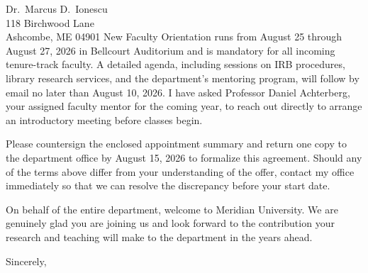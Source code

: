 \documentclass[
  fontsize=11pt,
  parskip=half,
  subject=titled,
  backaddress=true,
  fromalign=right,
  fromphone=true,
  fromemail=true,
  fromurl=true,
  addrfield=true,
  foldmarks=false,
  enlargefirstpage=true
]{scrletter}
\begin{document}
\begin{letter}{Dr.~Marcus D.~Ionescu\\118 Birchwood Lane\\Ashcombe, ME 04901}
New Faculty Orientation runs from August 25 through August 27, 2026 in Bellcourt Auditorium
and is mandatory for all incoming tenure-track faculty. A detailed agenda, including sessions
on IRB procedures, library research services, and the department's mentoring program, will
follow by email no later than August 10, 2026. I have asked Professor Daniel Achterberg, your
assigned faculty mentor for the coming year, to reach out directly to arrange an introductory
meeting before classes begin.

Please countersign the enclosed appointment summary and return one copy to the department
office by August 15, 2026 to formalize this agreement. Should any of the terms above differ
from your understanding of the offer, contact my office immediately so that we can resolve
the discrepancy before your start date.

On behalf of the entire department, welcome to Meridian University. We are genuinely glad you
are joining us and look forward to the contribution your research and teaching will make to
the department in the years ahead.

\closing{Sincerely,}


\end{letter}
\end{document}
